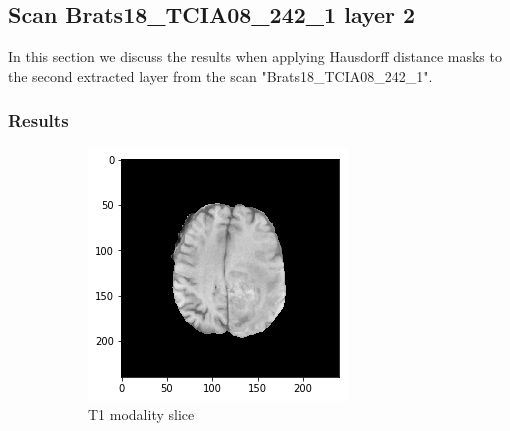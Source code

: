 \subsection{Scan Brats18\_TCIA08\_242\_1 layer 2}
In this section we discuss the results when applying Hausdorff distance masks to the second extracted layer from the scan "Brats18\_TCIA08\_242\_1".


\subsubsection{Results}

\begin{figure}[H]
    \centering
    \begin{subfigure}[t]{.4\textwidth}
        \centering
        \includegraphics[width=\linewidth]{chapters/06_hdm/b_Brats18_TCIA08_242_1_L2/21.png}
        \caption{T1 modality slice}
    \end{subfigure}\hspace{1cm}%
    \begin{subfigure}[t]{.4\textwidth}
        \centering

\end{subfigure}
\end{figure}
